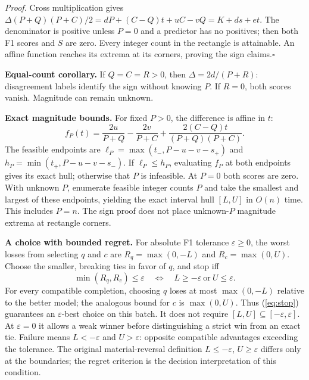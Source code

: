 \documentclass[a4paper]{esannV2}
\begin{document}
\noindent\textit{Proof.} Cross multiplication gives
$\Delta(P+Q)(P+C)/2=dP+(C-Q)t+uC-vQ=K+ds+et$.
The denominator is positive unless $P=0$ and a predictor has no positives;
then both F1 scores and $S$ are zero. Every integer count in the rectangle
is attainable. An affine function reaches its extrema at its corners,
proving the sign claims.\hfill$\square$

\noindent\textbf{Equal-count corollary.}
If $Q=C=R>0$, then $\Delta=2d/(P+R)$: disagreement labels identify the sign
without knowing $P$. If $R=0$, both scores vanish. Magnitude can remain unknown.

\noindent\textbf{Exact magnitude bounds.}
For fixed $P>0$, the difference is affine in $t$:
\begin{equation}\label{eq:fixed}
 f_P(t)=\frac{2u}{P+Q}-\frac{2v}{P+C}
          +\frac{2(C-Q)t}{(P+Q)(P+C)}.
\end{equation}
The feasible endpoints are
$\ell_P=\max(t_-,P-u-v-s_+)$ and
$h_P=\min(t_+,P-u-v-s_-)$.
If $\ell_P\le h_P$, evaluating $f_P$ at both endpoints gives its exact hull;
otherwise that $P$ is infeasible. At $P=0$ both scores are zero. With unknown
$P$, enumerate feasible integer counts $P$ and take the smallest and largest
of these endpoints, yielding the exact interval hull $[L,U]$ in $O(n)$ time.
This includes $P=n$. The sign proof does not place unknown-$P$
magnitude extrema at rectangle corners.

\noindent\textbf{A choice with bounded regret.}
For absolute F1 tolerance $\varepsilon\ge0$, the worst losses from selecting
$q$ and $c$ are $R_q=\max(0,-L)$ and $R_c=\max(0,U)$.
Choose the smaller, breaking ties in favor of $q$, and stop iff
\begin{equation}\label{eq:stop}
 \min(R_q,R_c)\le\varepsilon
 \quad\Longleftrightarrow\quad L\ge-\varepsilon\ \text{or}\ U\le\varepsilon.
\end{equation}
For every compatible completion, choosing $q$ loses at most $\max(0,-L)$
relative to the better model; the analogous bound for $c$ is $\max(0,U)$.
Thus (\ref{eq:stop}) guarantees an $\varepsilon$-best choice on this batch.
It does not require $[L,U]\subseteq[-\varepsilon,\varepsilon]$.
At $\varepsilon=0$ it allows a weak winner before distinguishing a strict win
from an exact tie. Failure means $L<-\varepsilon$ and $U>\varepsilon$: opposite compatible
advantages exceeding the tolerance. The original material-reversal definition
$L\le-\varepsilon$, $U\ge\varepsilon$ differs only at the boundaries; the
regret criterion is the decision interpretation of this condition.
\end{document}
